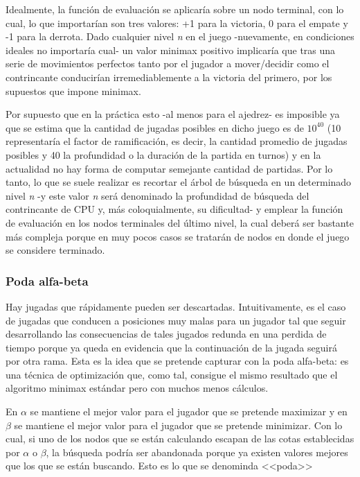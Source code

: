 \documentclass{llncs}
\begin{document}
Idealmente, la función de evaluación se aplicaría sobre un nodo terminal, con lo cual, lo que importarían son tres valores: +1 para la victoria, 0 para el empate y -1 para la derrota. Dado cualquier nivel \textit{n} en el juego -nuevamente, en condiciones ideales no importaría cual- un valor minimax positivo implicaría que tras una serie de movimientos perfectos tanto por el jugador a mover/decidir como el contrincante conducirían irremediablemente a la victoria del primero, por los supuestos que impone minimax.

Por supuesto que en la práctica esto -al menos para el ajedrez- es imposible ya que se estima que la cantidad de jugadas posibles en dicho juego es de $10^{40}$ (10 representaría el factor de ramificación, es decir, la cantidad promedio de jugadas posibles y 40 la profundidad o la duración de la partida en turnos) y en la actualidad no hay forma de computar semejante cantidad de partidas. Por lo tanto, lo que se suele realizar es recortar el árbol de búsqueda en un determinado nivel \textit{n} -y este valor \textit{n} será denominado la profundidad de búsqueda del contrincante de CPU y, más coloquialmente, su dificultad- y emplear la función de evaluación en los nodos terminales del último nivel, la cual deberá ser bastante más compleja porque en muy pocos casos se tratarán de nodos en donde el juego se considere terminado.


\subsubsection{ Poda alfa-beta }

Hay jugadas que rápidamente pueden ser descartadas. Intuitivamente, es el caso de jugadas que conducen a posiciones muy malas para un jugador tal que seguir desarrollando las consecuencias de tales jugados redunda en una perdida de tiempo porque ya queda en evidencia que la continuación de la jugada seguirá por otra rama. Esta es la idea que se pretende capturar con la poda alfa-beta: es una técnica de optimización que, como tal, consigue el mismo resultado que el algoritmo minimax estándar pero con muchos menos cálculos.

En $\alpha$ se mantiene el mejor valor para el jugador que se pretende maximizar y en $\beta$ se mantiene el mejor valor para el jugador que se pretende minimizar. Con lo cual, si uno de los nodos que se están calculando escapan de las cotas establecidas por $\alpha$ o $\beta$, la búsqueda podría ser abandonada porque ya existen valores mejores que los que se están buscando. Esto es lo que se denominda <<poda>>
\end{document}
